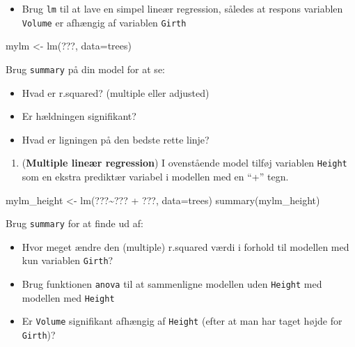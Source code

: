 \documentclass[
]{book}
\newenvironment{Shaded}{\begin{snugshade}}{\end{snugshade}}
\newcommand{\AttributeTok}[1]{\textcolor[rgb]{0.77,0.63,0.00}{#1}}
\newcommand{\FunctionTok}[1]{\textcolor[rgb]{0.00,0.00,0.00}{#1}}
\newcommand{\NormalTok}[1]{#1}
\newcommand{\OtherTok}[1]{\textcolor[rgb]{0.56,0.35,0.01}{#1}}
\newcommand{\SpecialCharTok}[1]{\textcolor[rgb]{0.00,0.00,0.00}{#1}}
\providecommand{\tightlist}{%
  \setlength{\itemsep}{0pt}\setlength{\parskip}{0pt}}
\begin{document}
\begin{itemize}
\tightlist
\item
  Brug \texttt{lm} til at lave en simpel lineær regression, således at respons variablen \texttt{Volume} er afhængig af variablen \texttt{Girth}
\end{itemize}

\begin{Shaded}
\begin{Highlighting}[]
\NormalTok{mylm }\OtherTok{\textless{}{-}} \FunctionTok{lm}\NormalTok{(???, }\AttributeTok{data=}\NormalTok{trees) }
\end{Highlighting}
\end{Shaded}

Brug \texttt{summary} på din model for at se:

\begin{itemize}
\tightlist
\item
  Hvad er r.squared? (multiple eller adjusted)
\item
  Er hældningen signifikant?
\item
  Hvad er ligningen på den bedste rette linje?
\end{itemize}

\begin{enumerate}
\def\labelenumi{\arabic{enumi})}
\setcounter{enumi}{17}
\tightlist
\item
  (\textbf{Multiple lineær regression}) I ovenstående model tilføj variablen \texttt{Height} som en ekstra prediktær variabel i modellen med en ``+'' tegn.
\end{enumerate}

\begin{Shaded}
\begin{Highlighting}[]
\NormalTok{mylm\_height }\OtherTok{\textless{}{-}} \FunctionTok{lm}\NormalTok{(???}\SpecialCharTok{\textasciitilde{}}\NormalTok{??? }\SpecialCharTok{+}\NormalTok{ ???, }\AttributeTok{data=}\NormalTok{trees) }
\FunctionTok{summary}\NormalTok{(mylm\_height)}
\end{Highlighting}
\end{Shaded}

Brug \texttt{summary} for at finde ud af:

\begin{itemize}
\tightlist
\item
  Hvor meget ændre den (multiple) r.squared værdi i forhold til modellen med kun variablen \texttt{Girth}?
\item
  Brug funktionen \texttt{anova} til at sammenligne modellen uden \texttt{Height} med modellen med \texttt{Height}
\item
  Er \texttt{Volume} signifikant afhængig af \texttt{Height} (efter at man har taget højde for \texttt{Girth})?
\end{itemize}
\end{document}
